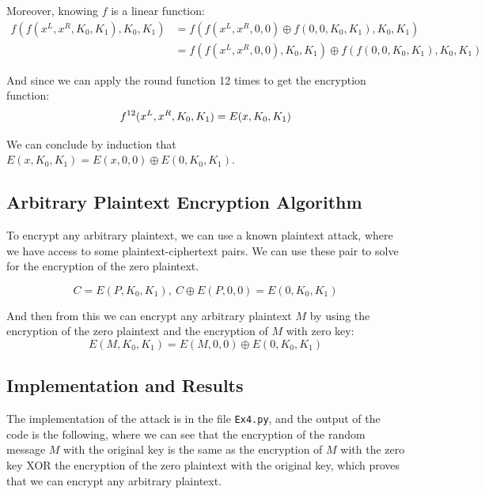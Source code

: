 \documentclass{article}
\begin{document}
Moreover, knowing $f$ is a linear function:
\begin{equation}
\begin{aligned}
    f(f(x^L, x^R, K_0, K_1), K_0, K_1) &= f(f(x^L, x^R, 0, 0) \oplus f(0, 0, K_0, K_1), K_0, K_1)\\
                                       &= f(f(x^L, x^R, 0, 0), K_0, K_1) \oplus f(f(0, 0, K_0, K_1), K_0, K_1)
\end{aligned}
\end{equation}

And since we can apply the round function 12 times to get the encryption function:
\begin{equation}
    f^{12}(x^L, x^R, K_0, K_1)=E(x, K_0, K_1)\\
\end{equation}

We can conclude by induction that $E(x, K_0, K_1) = E(x, 0, 0) \oplus E(0, K_0, K_1)$.

\subsection{Arbitrary Plaintext Encryption Algorithm}
To encrypt any arbitrary plaintext, we can use a known plaintext attack, where we have access to some plaintext-ciphertext pairs. We can use these pair to solve for the encryption of the zero plaintext.

\begin{equation}
    C = E(P, K_0, K_1),\ C \oplus E(P, 0, 0) = E(0, K_0, K_1) 
\end{equation}

And then from this we can encrypt any arbitrary plaintext $M$ by using the encryption of the zero plaintext and the encryption of $M$ with zero key:
\begin{equation}
    E(M, K_0, K_1) = E(M, 0, 0) \oplus E(0, K_0, K_1)
\end{equation}

\subsection{Implementation and Results}
The implementation of the attack is in the file \texttt{Ex4.py}, and the output of the code is the following, where we can see that the encryption of the random message $M$ with the original key is the same as the encryption of $M$ with the zero key XOR the encryption of the zero plaintext with the original key, which proves that we can encrypt any arbitrary plaintext.
\end{document}
